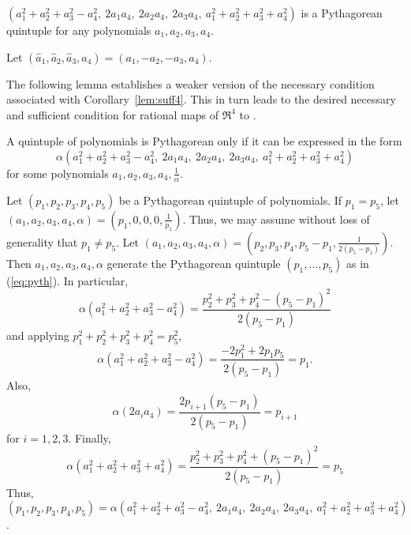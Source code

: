\begin{corollary}
\label{lem:suff4}
$(a_1^2 + a_2^2 + a_3^2 - a_4^2,\ 2a_1a_4,\ 2a_2a_4,\ 2a_3a_4,\ 
 a_1^2 + a_2^2 + a_3^2 + a_4^2)$
is a Pythagorean quintuple for any polynomials $a_1,a_2,a_3,a_4$.
\end{corollary}
\prf
Let $(\hat{a}_1,\hat{a}_2,\hat{a}_3,\hat{a}_4) = (a_1,-a_2,-a_3,a_4)$. 
\QED

\noindent The following lemma establishes a weaker version of the necessary condition
associated with Corollary~\ref{lem:suff4}.
This in turn leads to the desired necessary and sufficient condition for rational maps
of $\Re^4$ to \Sn{3}.

\begin{lemma}
\label{thm:necessary4}
A quintuple of polynomials is Pythagorean only if it can be expressed in the form
\begin{equation}
\label{eq:pyth}
	\alpha (a_1^2 + a_2^2 + a_3^2 - a_4^2,
		\ 2a_1a_4,\ 2a_2a_4,\ 2a_3a_4,
		\ a_1^2 + a_2^2 + a_3^2 + a_4^2)
\end{equation}
for some polynomials $a_1,a_2,a_3,a_4,\frac{1}{\alpha}$.
\end{lemma}
\prf
Let $(p_1,p_2,p_3,p_4,p_5)$ be a Pythagorean quintuple of polynomials.
If $p_1 = p_5$, let\\
$(a_1,a_2,a_3,a_4,\alpha) = (p_1,0,0,0,\frac{1}{p_1})$.
Thus, we may assume without loss of generality that $p_1 \neq p_5$.
Let $(a_1,a_2,a_3,a_4,\alpha) = (p_2,p_3,p_4,p_5-p_1,\frac{1}{2(p_5 - p_1)})$.
Then $a_1,a_2,a_3,a_4,\alpha$ generate the Pythagorean quintuple
$(p_1,\ldots,p_5)$ as in (\ref{eq:pyth}).
In particular,
\[
\alpha (a_1^2 + a_2^2 + a_3^2 - a_4^2)
= \frac{p_2^2 + p_3^2 + p_4^2 - (p_5 - p_1)^2}{2(p_5-p_1)}
\]
and applying $p_1^2 + p_2^2 + p_3^2 + p_4^2 = p_5^2$,
\[
\alpha (a_1^2 + a_2^2 + a_3^2 - a_4^2) = \frac{-2p_1^2 + 2p_1p_5}{2(p_5 - p_1)} = p_1.
\]
Also, 
\[
\alpha (2a_i a_4) = \frac{2p_{i+1}(p_5 - p_1)}{2(p_5 - p_1)} = p_{i+1}
\]
for $i=1,2,3$.
Finally, 
\[
\alpha(a_1^2 + a_2^2 + a_3^2 + a_4^2) 
= \frac{p_2^2 + p_3^2 + p_4^2 + (p_5 - p_1)^2}{2(p_5-p_1)} = p_5
\]
Thus, $(p_1,p_2,p_3,p_4,p_5) = \alpha (a_1^2 + a_2^2 + a_3^2 - a_4^2,
		\ 2a_1a_4,\ 2a_2a_4,\ 2a_3a_4,
		\ a_1^2 + a_2^2 + a_3^2 + a_4^2)$.
\QED


